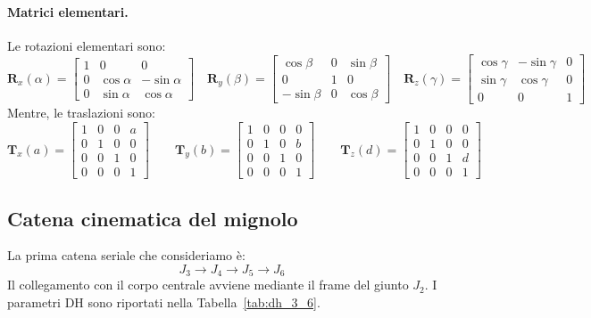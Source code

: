 \paragraph{Matrici elementari.}
Le rotazioni elementari sono:
\[
    \boldsymbol{R}_x(\alpha)=
    \begin{bmatrix}
        1&0&0\\0&\cos\alpha&-\sin\alpha\\0&\sin\alpha&\cos\alpha
    \end{bmatrix}
    \quad 
    \boldsymbol{R}_y(\beta)=
    \begin{bmatrix}
        \cos\beta&0&\sin\beta\\0&1&0\\-\sin\beta&0&\cos\beta
    \end{bmatrix}
    \quad
    \boldsymbol{R}_z(\gamma)=
    \begin{bmatrix}
        \cos\gamma&-\sin\gamma&0\\
        \sin\gamma&\cos\gamma&0\\0&0&1
    \end{bmatrix}
\]
Mentre, le traslazioni sono:
\[
    \boldsymbol{T}_x(a)=
    \begin{bmatrix}1&0&0&a\\0&1&0&0\\0&0&1&0\\0&0&0&1\end{bmatrix}
    \qquad
    \boldsymbol{T}_y(b)=
    \begin{bmatrix}1&0&0&0\\0&1&0&b\\0&0&1&0\\0&0&0&1\end{bmatrix}
    \qquad
    \boldsymbol{T}_z(d)=
    \begin{bmatrix}1&0&0&0\\0&1&0&0\\0&0&1&d\\0&0&0&1\end{bmatrix}
\]

\subsection{Catena cinematica del mignolo}
\label{subsec:little_chain}

La prima catena seriale che consideriamo è:
\[
    J_3\rightarrow J_4\rightarrow J_5\rightarrow J_6
\]
Il collegamento con il corpo centrale avviene mediante il frame del giunto $J_2$. 
I parametri DH sono riportati nella Tabella~\ref{tab:dh_3_6}.

